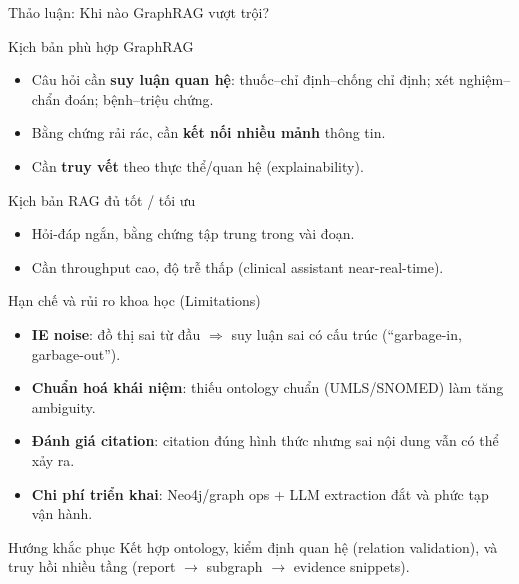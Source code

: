 \documentclass[aspectratio=169,10pt]{beamer}
\begin{document}
\begin{frame}{Thảo luận: Khi nào GraphRAG vượt trội?}
\small
\begin{block}{Kịch bản phù hợp GraphRAG}
\begin{itemize}
  \item Câu hỏi cần \textbf{suy luận quan hệ}: thuốc--chỉ định--chống chỉ định; xét nghiệm--chẩn đoán; bệnh--triệu chứng.
  \item Bằng chứng rải rác, cần \textbf{kết nối nhiều mảnh} thông tin.
  \item Cần \textbf{truy vết} theo thực thể/quan hệ (explainability).
\end{itemize}
\end{block}

\begin{block}{Kịch bản RAG đủ tốt / tối ưu}
\begin{itemize}
  \item Hỏi-đáp ngắn, bằng chứng tập trung trong vài đoạn.
  \item Cần throughput cao, độ trễ thấp (clinical assistant near-real-time).
\end{itemize}
\end{block}
\end{frame}

\begin{frame}{Hạn chế và rủi ro khoa học (Limitations)}
\small
\begin{itemize}
  \item \textbf{IE noise}: đồ thị sai từ đầu \(\Rightarrow\) suy luận sai có cấu trúc (``garbage-in, garbage-out'').
  \item \textbf{Chuẩn hoá khái niệm}: thiếu ontology chuẩn (UMLS/SNOMED) làm tăng ambiguity.
  \item \textbf{Đánh giá citation}: citation đúng hình thức nhưng sai nội dung vẫn có thể xảy ra.
  \item \textbf{Chi phí triển khai}: Neo4j/graph ops + LLM extraction đắt và phức tạp vận hành.
\end{itemize}

\vspace{0.2cm}
\begin{block}{Hướng khắc phục}
Kết hợp ontology, kiểm định quan hệ (relation validation), và truy hồi nhiều tầng (report \(\rightarrow\) subgraph \(\rightarrow\) evidence snippets).
\end{block}
\end{frame}
\end{document}
